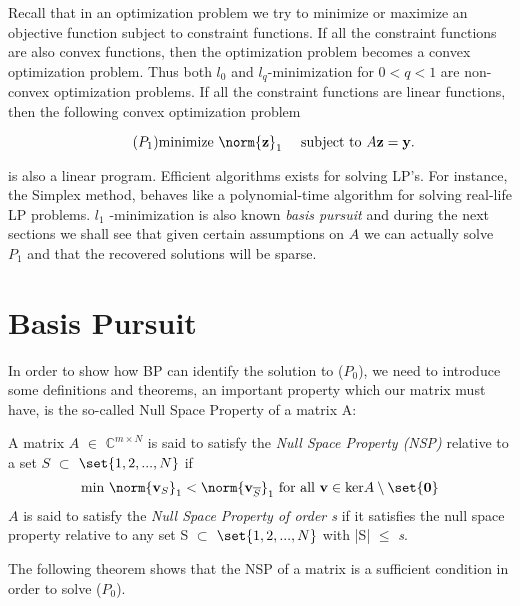 Recall that in an optimization problem we try to minimize or maximize an objective function subject to constraint functions. If all the constraint functions are also convex functions, then the optimization problem becomes a convex optimization problem. Thus both $l_0$ and $l_q$-minimization for $0 < q < 1$ are non-convex optimization problems. If all the constraint functions are linear functions, then the following convex optimization problem


\begin{equation}
\tag{$P_1$}
\text{minimize} \  \norm{ \mathbf{z}}_{1} \ \ \ \ \text{subject to}   \ A \mathbf{z}=\mathbf{y}.
\end{equation}

 is also a linear program. Efficient algorithms exists for solving LP's. For instance, the Simplex method, behaves like a polynomial-time algorithm for solving real-life LP problems. $l_1$ -minimization is also known \emph{basis pursuit} and during the next sections we shall see that given certain assumptions on $A$ we can actually solve $P_1$ and that the recovered solutions will be sparse.
 \section{Basis Pursuit} 

In order to show how BP can identify the solution to ($P_{0}$), we need to introduce some definitions and theorems, an important property which our matrix must have, is the so-called Null Space Property of a matrix A: 


\begin{tcolorbox}[colback=blue,colframe=white]
\begin{definition} 
A matrix $A$  $\in$ $\mathbb{C}^{m \times N}$ is said to satisfy the \emph{Null Space Property (NSP)} relative to a set $S$ $\subset$ $\set{1,2,...,N}$ if 
\[
\text{min} \ \norm{ \mathbf{v}_{S}}_{1}  <  \norm{ \mathbf{v}_{\overline{S}}}_{1}  \ \text{for all} \ \mathbf{v} \in \text{ker} A \setminus \set{\mathbf{0}}
\]
$A$ is said to satisfy the \emph{Null Space Property of order s} if it satisfies the null space property relative to any set S $\subset$ $\set{1,2,...,N}$ with |S| $\leq$ \emph{s}.
\end{definition}
\end{tcolorbox}

The following theorem shows that the NSP of a matrix is a sufficient condition in order to solve ($P_{0}$).


